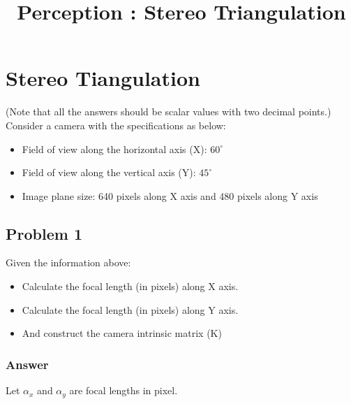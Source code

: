 \documentclass[12pt]{article}
\begin{document}
 
 
\title{Perception : Stereo Triangulation}
\date{\vspace{-20mm}}
\maketitle

\section*{Stereo Tiangulation} 

(Note that all the answers should be scalar values with two decimal points.) \vspace{5mm} \\ 
Consider a camera with the specifications as below:

\begin{itemize}
	\item Field of view along the horizontal axis (X): $60^\circ$
	\item Field of view along the vertical axis (Y): $45^\circ$
	\item Image plane size: 640 pixels along X axis and 480 pixels along Y axis
\end{itemize}
 
\subsection*{Problem 1}

Given the information above:

\begin{itemize}
	\item Calculate the focal length (in pixels) along X axis.
	\item Calculate the focal length (in pixels) along Y axis.
	\item And construct the camera intrinsic matrix (K)
\end{itemize}

\subsubsection*{Answer}
 
Let $\alpha_x$ and $\alpha_y$ are focal lengths in pixel. 
\end{document}
